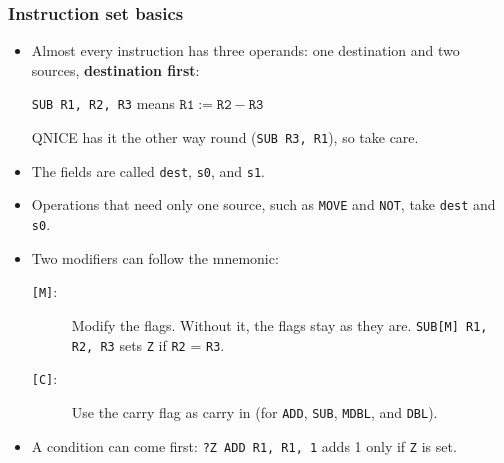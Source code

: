 \documentclass{beamer}
\newcommand{\code}[1]{\texttt{#1}}
\begin{document}
%
   \begin{frame}
    \frametitle{Instruction set basics}
    \begin{itemize}
     \item Almost every instruction has three operands: one destination
      and two sources, \textbf{destination first}:
      \begin{center}
       \code{SUB R1, R2, R3} \quad means \quad
       $\code{R1} := \code{R2} - \code{R3}$
      \end{center}
      QNICE has it the other way round (\code{SUB R3, R1}), so take care.
     \item The fields are called \code{dest}, \code{s0}, and \code{s1}.
     \item Operations that need only one source, such as \code{MOVE} and
      \code{NOT}, take \code{dest} and \code{s0}.
     \item Two modifiers can follow the mnemonic:
      \begin{description}
       \item [\code{[M]}:] Modify the flags. Without it, the flags stay as
        they are. \code{SUB[M] R1, R2, R3} sets \code{Z} if
        \code{R2} = \code{R3}.
       \item [\code{[C]}:] Use the carry flag as carry in (for
        \code{ADD}, \code{SUB}, \code{MDBL}, and \code{DBL}).
      \end{description}
     \item A condition can come first: \code{?Z ADD R1, R1, 1} adds 1
      only if \code{Z} is set.
    \end{itemize}
   \end{frame}
%
\end{document}
